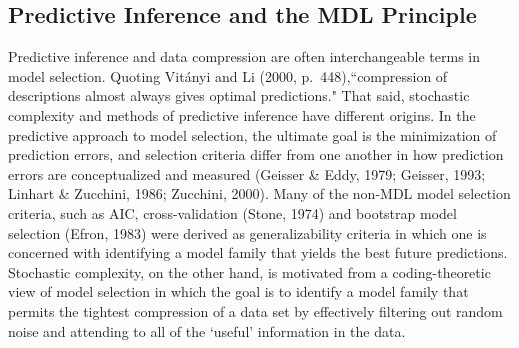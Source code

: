 \documentclass{elsart}
\begin{document}
\subsection{Predictive Inference and the MDL Principle}


Predictive inference and data compression are often interchangeable terms in model selection.
Quoting Vit\'{a}nyi and Li (2000, p.~448),``compression of descriptions almost always gives optimal
predictions." That said, stochastic complexity and methods of predictive inference have different
origins. In the predictive approach to model selection, the ultimate goal is the minimization of
prediction errors, and selection criteria differ from one another in how prediction errors are
conceptualized and measured (Geisser \& Eddy, 1979; Geisser, 1993; Linhart \& Zucchini, 1986;
Zucchini, 2000). Many of the non-MDL model selection criteria, such as AIC, cross-validation
(Stone, 1974) and bootstrap model selection (Efron, 1983) were derived as generalizability
criteria in which one is concerned with identifying a model family that yields the best future
predictions. Stochastic complexity, on the other hand, is motivated from a coding-theoretic view
of model selection in which the goal is to identify a model family that permits the tightest
compression of a data set by effectively filtering out random noise and attending to all of the
`useful' information in the data.
\end{document}
